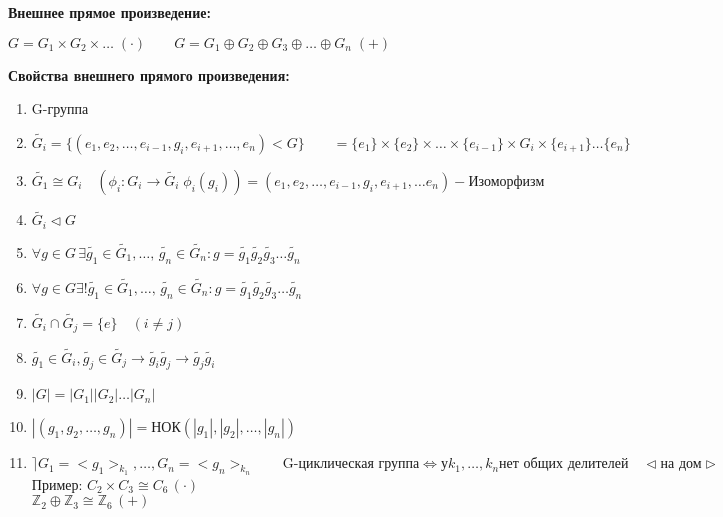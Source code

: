 \documentclass[12pt]{article}
\begin{document}
		
		
		\hypertarget{def:out_comp}{\textbf{Внешнее прямое произведение:}} $G=G_1 \times G_2 \times \dots \; (\cdot) \qquad G=G_1\oplus G_2 \oplus G_3 \oplus \dots \oplus G_n \; (+)$
		
		
		\hypertarget{inpro:out_comp}{\textbf{Свойства внешнего прямого произведения:}}
		\begin{enumerate}
			\item G-группа
			\item $\tilde{G_i}=\{ (e_1, e_2, \dots , e_{i-1}, g_i, e_{i+1}, \dots, e_n)<G \} \qquad 
			=\{e_1 \}\times \{e_2\} \times \dots \times \{e_{i-1}\} \times G_i \times \{e_{i+1}\}\dots \{e_n\}$
			\item $\tilde{G_1} \cong G_i \quad (\phi_i :G_i \rightarrow \tilde{G_i} \; \phi_i(g_i))=(e_1, e_2, \dots, e_{i-1}, g_i, e_{i+1}, \dots e_n)- \text{Изоморфизм} $
			\item $\tilde{G_i} \lhd G$
			
			\item $\forall g \in G \, \exists \tilde{g_1}\in \tilde{G_1}, \dots , \, \tilde{g_n}\in \tilde{G_n}: g=\tilde{g_1} \tilde{g_2} \tilde{g_3} \dots \tilde{g_n} $	
			\item $\forall g\in G \exists! \tilde{g_1}\in \tilde{G_1}, \dots , \, \tilde{g_n} \in \tilde{G_n}: g=\tilde{g_1} \tilde{g_2} \tilde{g_3} \dots \tilde{g_n} $
			\item $\tilde{G_i} \cap \tilde{G_j}=\{e\} \quad (i\not= j)  $
			\item $\tilde{g_1}\in \tilde{G_i}, \tilde{g_j}\in \tilde{G_j} \rightarrow \tilde{g_i}\tilde{g_j}\rightarrow \tilde{g_j}\tilde{g_i}$  
			\item $|G|=|G_1||G_2|\dots |G_n|$
			\item $|(g_1,g_2, \dots ,g_n)|=\text{НОК}(|g_1|,|g_2|, \dots , |g_n|)  $
			\item $\rceil G_1=<g_1>_{k_1}, \dots ,G_n=<g_n>_{k_n}  \qquad \text{G-циклическая группа} \Leftrightarrow \text{у} k_1, \dots , k_n \text{нет общих делителей} \quad \lhd \text{на дом} \rhd$\\
			Пример: $C_2 \times C_3 \cong C_6 \, (\cdot) $\\
			$\mathds{Z}_2 \oplus \mathds{Z}_3 \cong \mathds{Z}_6 \, (+)$ 
		\end{enumerate} 
\end{document}
